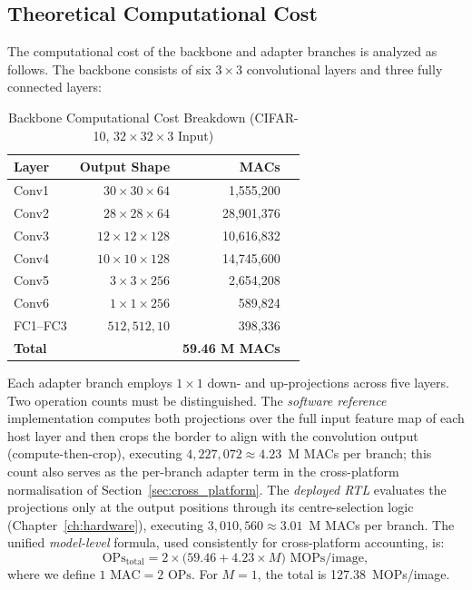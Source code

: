 \documentclass[12pt, a4paper]{report}
\numberwithin{equation}{chapter}
\numberwithin{figure}{chapter}
\numberwithin{table}{chapter}
\numberwithin{algorithm}{chapter}
\begin{document}
\subsection{Theoretical Computational Cost}

The computational cost of the backbone and adapter branches is analyzed as follows. The backbone consists of six $3 \times 3$ convolutional layers and three fully connected layers:

\begin{table}[H]
\centering
\caption{Backbone Computational Cost Breakdown (CIFAR-10, $32 \times 32 \times 3$ Input)}
\label{tab:backbone_macs}
\begin{tabular}{lrrr}
\toprule
\textbf{Layer} & \textbf{Output Shape} & \textbf{MACs} \\
\midrule
Conv1 & $30 \times 30 \times 64$  & 1{,}555{,}200 \\
Conv2 & $28 \times 28 \times 64$  & 28{,}901{,}376 \\
Conv3 & $12 \times 12 \times 128$ & 10{,}616{,}832 \\
Conv4 & $10 \times 10 \times 128$ & 14{,}745{,}600 \\
Conv5 & $3 \times 3 \times 256$   & 2{,}654{,}208 \\
Conv6 & $1 \times 1 \times 256$   & 589{,}824 \\
FC1--FC3 & $512, 512, 10$          & 398{,}336 \\
\midrule
\textbf{Total} & & \textbf{59.46 M MACs} \\
\bottomrule
\end{tabular}
\end{table}

Each adapter branch employs $1 \times 1$ down- and up-projections across five layers. Two operation counts must be distinguished. The \emph{software reference} implementation computes both projections over the full input feature map of each host layer and then crops the border to align with the convolution output (compute-then-crop), executing $4{,}227{,}072 \approx 4.23$~M MACs per branch; this count also serves as the per-branch adapter term in the cross-platform normalisation of Section~\ref{sec:cross_platform}. The \emph{deployed RTL} evaluates the projections only at the output positions through its centre-selection logic (Chapter~\ref{ch:hardware}), executing $3{,}010{,}560 \approx 3.01$~M MACs per branch. The unified \emph{model-level} formula, used consistently for cross-platform accounting, is:
\begin{equation}
\text{OPs}_{\text{total}} = 2 \times \bigl(59.46 + 4.23 \times M\bigr) \text{ MOPs/image},
\end{equation}
where we define $1 \text{ MAC} = 2 \text{ OPs}$. For $M = 1$, the total is 127.38~MOPs/image.
\end{document}
